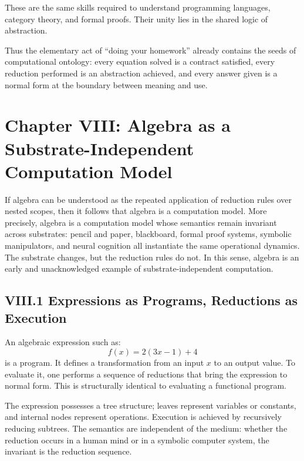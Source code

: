 \documentclass[11pt,letterpaper]{article}
\begin{document}
These are the same skills required to understand programming languages, category theory, and formal proofs. Their unity lies in the shared logic of abstraction.

Thus the elementary act of ``doing your homework'' already contains the seeds of computational ontology: every equation solved is a contract satisfied, every reduction performed is an abstraction achieved, and every answer given is a normal form at the boundary between meaning and use.

\newpage
\section{Chapter VIII: Algebra as a Substrate-Independent Computation Model}

If algebra can be understood as the repeated application of reduction rules over nested scopes, then it follows that algebra is a computation model. More precisely, algebra is a computation model whose semantics remain invariant across substrates: pencil and paper, blackboard, formal proof systems, symbolic manipulators, and neural cognition all instantiate the same operational dynamics. The substrate changes, but the reduction rules do not. In this sense, algebra is an early and unacknowledged example of substrate-independent computation.

\subsection{VIII.1 Expressions as Programs, Reductions as Execution}

An algebraic expression such as:
\[
f(x) = 2(3x - 1) + 4
\]
is a program. It defines a transformation from an input \(x\) to an output value. To evaluate it, one performs a sequence of reductions that bring the expression to normal form. This is structurally identical to evaluating a functional program.

The expression possesses a tree structure; leaves represent variables or constants, and internal nodes represent operations. Execution is achieved by recursively reducing subtrees. The semantics are independent of the medium: whether the reduction occurs in a human mind or in a symbolic computer system, the invariant is the reduction sequence.
\end{document}
